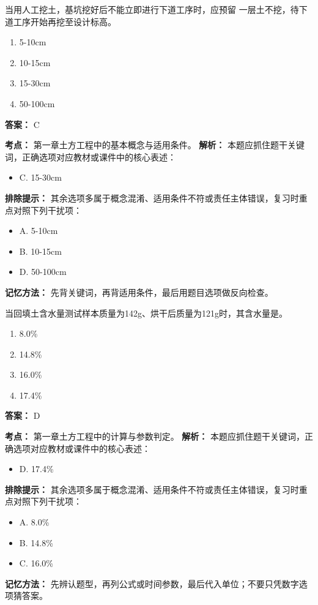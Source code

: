 \documentclass[UTF8,fontset=fandol,11pt]{ctexart}
\begin{document}
\begin{quizbox}[title={第 30 题}]
当用人工挖土，基坑挖好后不能立即进行下道工序时，应预留 一层土不挖，待下道工序开始再挖至设计标高。\\
\begin{enumerate}[label=\Alph*.]
\item 5-10cm
\item 10-15cm
\item 15-30cm
\item 50-100cm
\end{enumerate}
\textbf{答案：} C
\vspace{0.25em}
\begin{answerbox}[title={考点解析}]
\textbf{考点：} 第一章土方工程中的基本概念与适用条件。
\textbf{解析：} 本题应抓住题干关键词，正确选项对应教材或课件中的核心表述：
\begin{itemize}
\item C. 15-30cm
\end{itemize}
\textbf{排除提示：} 其余选项多属于概念混淆、适用条件不符或责任主体错误，复习时重点对照下列干扰项：
\begin{itemize}
\item A. 5-10cm
\item B. 10-15cm
\item D. 50-100cm
\end{itemize}
\textbf{记忆方法：} 先背关键词，再背适用条件，最后用题目选项做反向检查。
\end{answerbox}
\end{quizbox}

\begin{quizbox}[title={第 31 题}]
当回填土含水量测试样本质量为142g、烘干后质量为121g时，其含水量是。\\
\begin{enumerate}[label=\Alph*.]
\item 8.0\%
\item 14.8\%
\item 16.0\%
\item 17.4\%
\end{enumerate}
\textbf{答案：} D
\vspace{0.25em}
\begin{answerbox}[title={考点解析}]
\textbf{考点：} 第一章土方工程中的计算与参数判定。
\textbf{解析：} 本题应抓住题干关键词，正确选项对应教材或课件中的核心表述：
\begin{itemize}
\item D. 17.4\%
\end{itemize}
\textbf{排除提示：} 其余选项多属于概念混淆、适用条件不符或责任主体错误，复习时重点对照下列干扰项：
\begin{itemize}
\item A. 8.0\%
\item B. 14.8\%
\item C. 16.0\%
\end{itemize}
\textbf{记忆方法：} 先辨认题型，再列公式或时间参数，最后代入单位；不要只凭数字选项猜答案。
\end{answerbox}
\end{quizbox}
\end{document}
